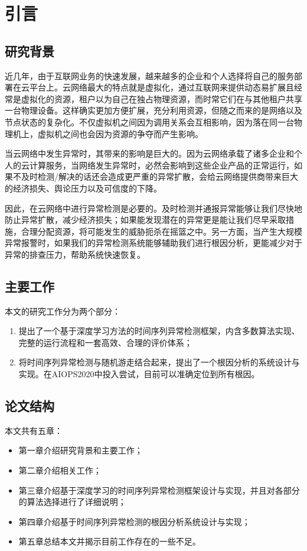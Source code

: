 
\chapter{引言}
\label{cha:intro}

\section{研究背景}
近几年，由于互联网业务的快速发展，越来越多的企业和个人选择将自己的服务部署在云平台上。云网络最大的特点就是虚拟化，通过互联网来提供动态易扩展且经常是虚拟化的资源，租户以为自己在独占物理资源，而时常它们在与其他租户共享一台物理设备。这样确实更加方便扩展，充分利用资源，但随之而来的是网络以及节点状态的复杂化。不仅虚拟机之间因为调用关系会互相影响，因为落在同一台物理机上，虚拟机之间也会因为资源的争夺而产生影响。

当云网络中发生异常时，其带来的影响是巨大的。因为云网络承载了诸多企业和个人的云计算服务，当网络发生异常时，必然会影响到这些企业产品的正常运行，如果不及时检测/解决的话还会造成更严重的异常扩散，会给云网络提供商带来巨大的经济损失、舆论压力以及可信度的下降。

因此，在云网络中进行异常检测是必要的。及时检测并通报异常能够让我们尽快地防止异常扩散，减少经济损失；如果能发现潜在的异常更是能让我们尽早采取措施，合理分配资源，将可能发生的威胁扼杀在摇篮之中。另一方面，当产生大规模异常报警时，如果我们的异常检测系统能够辅助我们进行根因分析，更能减少对于异常的排查压力，帮助系统快速恢复。
\section{主要工作}
本文的研究工作分为两个部分：

\begin{enumerate}
    \item 提出了一个基于深度学习方法的时间序列异常检测框架，内含多数算法实现、完整的运行流程和一套高效、合理的评价体系；
    \item 将时间序列异常检测与随机游走结合起来，提出了一个根因分析的系统设计与实现。在AIOPS2020中投入尝试，目前可以准确定位到所有根因。
\end{enumerate}
\section{论文结构}
本文共有五章：
\begin{itemize}
    \item 第一章介绍研究背景和主要工作；
    \item 第二章介绍相关工作；
    \item 第三章介绍基于深度学习的时间序列异常检测框架设计与实现，并且对各部分的算法选择进行了详细说明；
    \item 第四章介绍基于时间序列异常检测的根因分析系统设计与实现；
    \item 第五章总结本文并揭示目前工作存在的一些不足。
\end{itemize}